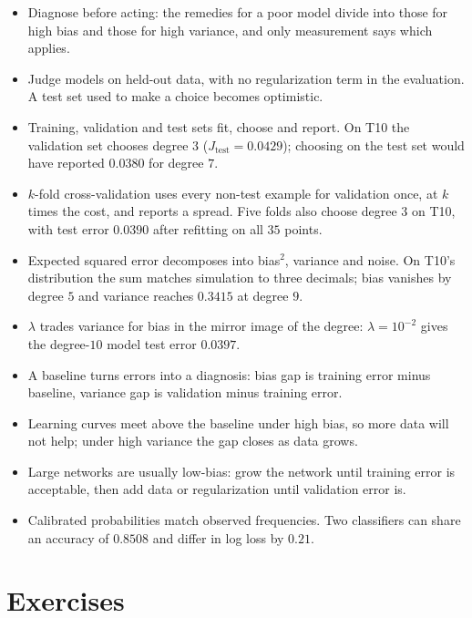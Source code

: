 \begin{itemize}
  \item Diagnose before acting: the remedies for a poor model divide into those
        for high bias and those for high variance, and only measurement says
        which applies.
  \item Judge models on held-out data, with no regularization term in the
        evaluation. A test set used to make a choice becomes optimistic.
  \item Training, validation and test sets fit, choose and report. On T10 the
        validation set chooses degree $3$ ($J_{\text{test}} = 0.0429$); choosing
        on the test set would have reported $0.0380$ for degree $7$.
  \item $k$-fold cross-validation uses every non-test example for validation once,
        at $k$ times the cost, and reports a spread. Five folds also choose degree
        $3$ on T10, with test error $0.0390$ after refitting on all $35$ points.
  \item Expected squared error decomposes into bias$^2$, variance and noise. On
        T10's distribution the sum matches simulation to three decimals; bias
        vanishes by degree $5$ and variance reaches $0.3415$ at degree $9$.
  \item $\lambda$ trades variance for bias in the mirror image of the degree:
        $\lambda = 10^{-2}$ gives the degree-$10$ model test error $0.0397$.
  \item A baseline turns errors into a diagnosis: bias gap is training error
        minus baseline, variance gap is validation minus training error.
  \item Learning curves meet above the baseline under high bias, so more data
        will not help; under high variance the gap closes as data grows.
  \item Large networks are usually low-bias: grow the network until training
        error is acceptable, then add data or regularization until validation
        error is.
  \item Calibrated probabilities match observed frequencies. Two classifiers can
        share an accuracy of $0.8508$ and differ in log loss by $0.21$.
\end{itemize}

\section*{Exercises}

